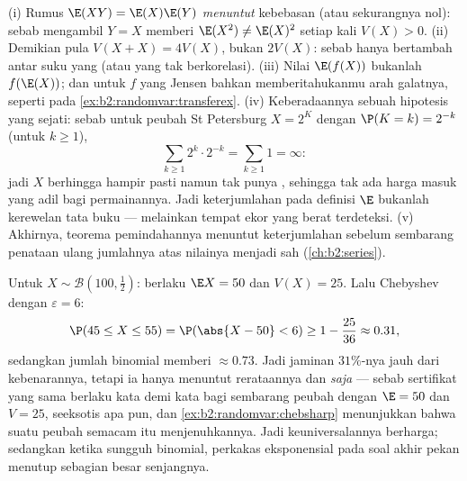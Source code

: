 \begin{remark}
(i) Rumus $\E(XY) = \E(X)\E(Y)$ \emph{menuntut} kebebasan (atau sekurangnya
 nol): sebab mengambil $Y = X$ memberi $\E(X^2) \neq
\E(X)^2$ setiap kali $V(X) > 0$. (ii) Demikian pula $V(X + X) =
4V(X)$, bukan $2V(X)$: sebab  hanya bertambah antar suku yang 
(atau yang tak berkorelasi). (iii) Nilai $\E(f(X))$ bukanlah
$f(\E(X))$; dan untuk $f$ yang  Jensen bahkan memberitahukanmu
arah galatnya, seperti pada
\cref{ex:b2:randomvar:transferex}. (iv) Keberadaannya sebuah
hipotesis yang sejati: sebab untuk peubah St Petersburg $X = 2^K$ dengan
$\P(K = k) = 2^{-k}$ (untuk $k \geq 1$),
\[
\sum_{k\geq1}2^k\cdot2^{-k} = \sum_{k\geq1}1 = \infty :
\]
jadi $X$ berhingga hampir pasti namun tak punya , sehingga tak ada
harga masuk yang adil bagi permainannya. Jadi keterjumlahan pada
definisi $\E$ bukanlah kerewelan tata buku --- melainkan tempat
ekor yang berat terdeteksi. (v) Akhirnya, teorema
pemindahannya menuntut keterjumlahan \emph{} sebelum sembarang
penataan ulang jumlahnya atas nilainya menjadi sah
(\cref{ch:b2:series}).
\end{remark}


\begin{example}\label{ex:b2:randomvar:hundredtosses}
Untuk $X \sim \mathcal B(100, \frac12)$: berlaku $\E X = 50$ dan $V(X) =
25$. Lalu Chebyshev dengan $\varepsilon = 6$:
\[
\P(45 \leq X \leq 55) = \P(\abs{X - 50} < 6)
\geq 1 - \frac{25}{36} \approx 0.31 ,
\]
sedangkan jumlah binomial  memberi $\approx 0.73$. Jadi
jaminan $31\%$-nya jauh dari kebenarannya, tetapi ia hanya menuntut
rerataannya dan  \emph{saja} --- sebab sertifikat yang sama
berlaku kata demi kata bagi sembarang peubah dengan $\E = 50$ dan $V = 25$,
seeksotis apa pun, dan \cref{ex:b2:randomvar:chebsharp} menunjukkan
bahwa suatu peubah semacam itu menjenuhkannya. Jadi keuniversalannya berharga;
sedangkan ketika  sungguh binomial, perkakas eksponensial
pada soal akhir pekan menutup sebagian besar senjangnya.
\end{example}


